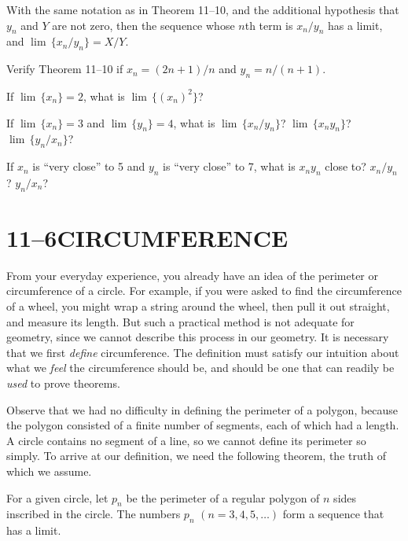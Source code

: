 \documentclass[11pt]{book}
\theoremstyle{bkplain}
\theoremstyle{XIplainnote}
\theoremstyle{bkplain}
\theoremstyle{bkplain}
\begin{document}
\begin{theorem}
With the same notation as in Theorem 11--10, and the additional hypothesis that
$y_n$ and $Y$ are not zero, then the sequence whose $n$th term is $x_n/y_n$ has
a limit, and $\lim\,\{x_n/y_n\} = X/Y$.
\end{theorem}

\begin{exercisecols}
\begin{exlist}
\item Verify Theorem 11--10 if $x_n = (2n + 1)/n$ and $y_n = n/(n + 1)$.
\item If $\lim\,\{x_n\} = 2$, what is $\lim\,\{(x_n)^2\}$?
\item If $\lim\,\{x_n\} = 3$ and $\lim\,\{y_n\} = 4$, what is
      $\lim\,\{x_n/y_n\}$? $\lim\,\{x_n y_n\}$? $\lim\,\{y_n/x_n\}$?
\item If $x_n$ is ``very close'' to 5 and $y_n$ is ``very close'' to 7, what is
      $x_n y_n$ close to? $x_n/y_n$? $y_n/x_n$?
\end{exlist}
\end{exercisecols}

\section*{11--6\quad CIRCUMFERENCE}

From your everyday experience, you already have an idea of the perimeter or
circumference of a circle. For example, if you were asked to find the
circumference of a wheel, you might wrap a string around the wheel, then pull
it out straight, and measure its length. But such a practical method is not
adequate for geometry, since we cannot describe this process in our geometry.
It is necessary that we first \emph{define} circumference. The definition must
satisfy our intuition about what we \emph{feel} the circumference should be,
and should be one that can readily be \emph{used} to prove theorems.

Observe that we had no difficulty in defining the perimeter of a polygon,
because the polygon consisted of a finite number of segments, each of which had
a length. A circle contains no segment of a line, so we cannot define its
perimeter so simply. To arrive at our definition, we need the following
theorem, the truth of which we assume.

\begin{theorem}
For a given circle, let $p_n$ be the perimeter of a regular polygon of $n$
sides inscribed in the circle. The numbers $p_n$ $(n = 3, 4, 5,\ldots)$ form a
sequence that has a limit.
\end{theorem}
\end{document}
